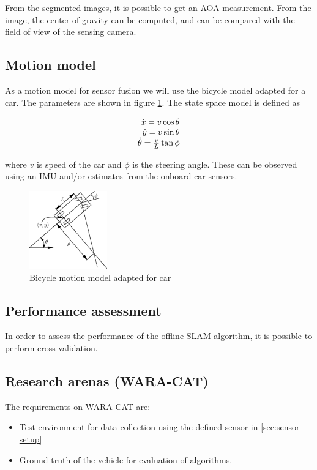 From the segmented images, it is possible to get an \gls{AOA}
measurement. From the image, the center of gravity can be computed,
and can be compared with the field of view of the sensing camera.

\subsection{Motion model}
As a motion model for sensor fusion we will use the bicycle model adapted for a car.
The parameters are shown in figure \ref{fig:motion_model}. The state space model is defined as

\begin{equation}
 \begin{array}[b]{r}
  \dot{x} = v \cos \theta \\
  \dot{y} = v \sin \theta \\
  \dot{\theta} = \frac{v}{L} \tan{\phi}
 \end{array}
\end{equation}

where $v$ is speed of the car and $\phi$ is the steering angle. 
These can be observed using an IMU and/or estimates from the onboard car sensors.


\begin{figure}
\label{fig:motion_model}
\includegraphics[width=0.3\textwidth]{figures/bicycle_model.pdf}
\caption{Bicycle motion model adapted for car}
\end{figure}



\subsection{Performance assessment}

In order to assess the performance of the offline \gls{SLAM}
algorithm, it is possible to perform cross-validation.

\subsection{Research arenas (WARA-CAT)}


The requirements on WARA-CAT are:
\begin{itemize}
  \item Test environment for data collection using the defined sensor in
    \ref{sec:sensor-setup}
\item Ground truth of the vehicle for evaluation of algorithms.
\end{itemize}


